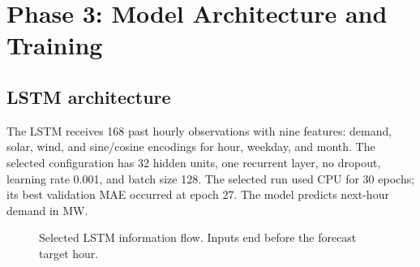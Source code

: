 \documentclass[11pt,a4paper]{article}
\begin{document}
\section{Phase 3: Model Architecture and Training}
\subsection{LSTM architecture}
The LSTM receives 168 past hourly observations with nine features: demand, solar, wind, and sine/cosine encodings for hour, weekday, and month. The selected configuration has 32 hidden units, one recurrent layer, no dropout, learning rate 0.001, and batch size 128. The selected run used CPU for 30 epochs; its best validation MAE occurred at epoch 27. The model predicts next-hour demand in MW.
\begin{figure}[H]\centering
{}
\caption{Selected LSTM information flow. Inputs end before the forecast target hour.}
\end{figure}
\end{document}
